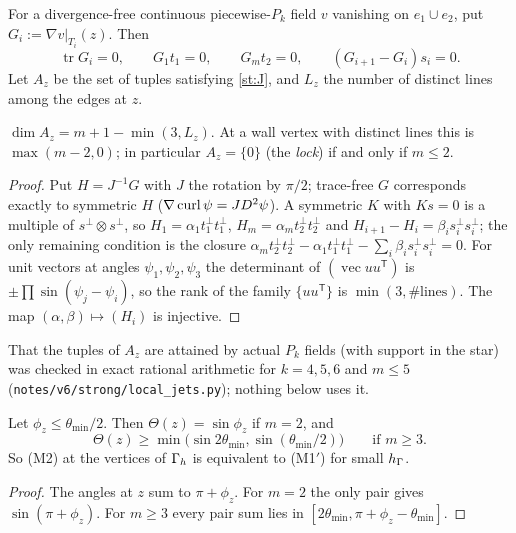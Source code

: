 For a divergence-free continuous piecewise-$P_k$ field $v$ vanishing on $e_1\cup e_2$, put $G_i:=\nabla v|_{T_i}(z)$. Then
\begin{equation}\label{st:J}
\operatorname{tr}G_i=0,\qquad G_1t_1=0,\qquad G_mt_2=0,\qquad (G_{i+1}-G_i)s_i=0 .
\end{equation}
Let $A_z$ be the set of tuples satisfying \eqref{st:J}, and $L_z$ the number of distinct lines among the edges at $z$.

\begin{lemma}\label{st:L1}
$\dim A_z=m+1-\min(3,L_z)$. At a wall vertex with distinct lines this is $\max(m-2,0)$; in particular $A_z=\{0\}$ (the \emph{lock}) if and only if $m\le2$.
\end{lemma}

\begin{proof}
Put $H=J^{-1}G$ with $J$ the rotation by $\pi/2$; trace-free $G$ corresponds exactly to symmetric $H$ ($\nabla\operatorname{curl}\psi=JD^2\psi$). A symmetric $K$ with $Ks=0$ is a multiple of $s^\perp\otimes s^\perp$, so $H_1=\alpha_1t_1^\perp t_1^\perp$, $H_m=\alpha_mt_2^\perp t_2^\perp$ and $H_{i+1}-H_i=\beta_is_i^\perp s_i^\perp$; the only remaining condition is the closure $\alpha_mt_2^\perp t_2^\perp-\alpha_1t_1^\perp t_1^\perp-\sum_i\beta_is_i^\perp s_i^\perp=0$. For unit vectors at angles $\psi_1,\psi_2,\psi_3$ the determinant of $(\operatorname{vec}uu^{\mathsf T})$ is $\pm\prod\sin(\psi_j-\psi_i)$, so the rank of the family $\{uu^{\mathsf T}\}$ is $\min(3,\#\text{lines})$. The map $(\alpha,\beta)\mapsto(H_i)$ is injective.
\end{proof}

That the tuples of $A_z$ are attained by actual $P_k$ fields (with support in the star) was checked in exact rational arithmetic for $k=4,5,6$ and $m\le5$ (\texttt{notes/v6/strong/local\_jets.py}); nothing below uses it.

\begin{lemma}\label{st:L2}
Let $\phi_z\le\theta_{\min}/2$. Then $\Theta(z)=\sin\phi_z$ if $m=2$, and
\[
\Theta(z)\ge\min\bigl(\sin2\theta_{\min},\sin(\theta_{\min}/2)\bigr)\qquad\text{if }m\ge3 .
\]
So (M2) at the vertices of $\Gamma_h$ is equivalent to (M1$'$) for small $h_\Gamma$.
\end{lemma}

\begin{proof}
The angles at $z$ sum to $\pi+\phi_z$. For $m=2$ the only pair gives $\sin(\pi+\phi_z)$. For $m\ge3$ every pair sum lies in $[2\theta_{\min},\pi+\phi_z-\theta_{\min}]$.
\end{proof}

